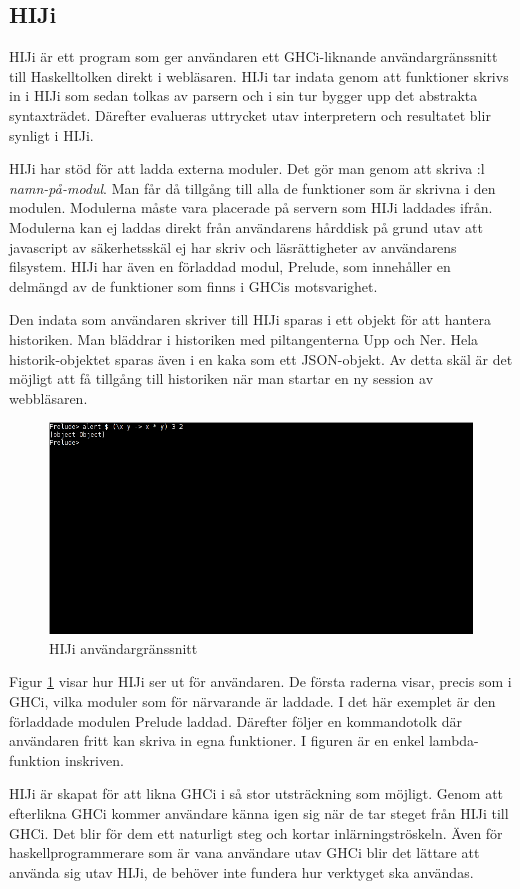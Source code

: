 \subsection{HIJi}

HIJi är ett program som ger användaren ett GHCi-liknande användargränssnitt till Haskelltolken direkt i webläsaren. 
HIJi tar indata genom att funktioner skrivs in i HIJi som sedan tolkas av parsern och i sin tur bygger upp det abstrakta syntaxträdet. Därefter evalueras uttrycket utav interpretern och resultatet blir synligt i HIJi.

HIJi har stöd för att ladda externa moduler. Det gör man genom att skriva :l \emph{namn-på-modul}. Man får då tillgång till alla de funktioner som är skrivna i den modulen. Modulerna måste vara placerade på servern som HIJi laddades ifrån. Modulerna kan ej laddas direkt från användarens hårddisk på grund utav att javascript av säkerhetsskäl ej har skriv och läsrättigheter av användarens filsystem. HIJi har även en förladdad modul, Prelude, som innehåller en delmängd av de funktioner som finns i GHCis motsvarighet. 

Den indata som användaren skriver till HIJi sparas i ett objekt för att hantera historiken. Man bläddrar i historiken med piltangenterna Upp och Ner. Hela historik-objektet sparas även i en kaka som ett JSON-objekt. Av detta skäl är det möjligt att få tillgång till historiken när man startar en ny session av webbläsaren.

\begin{figure}[H]
    \begin{center}
        \includegraphics[width=1\textwidth]{hiji_screen3.png}
        \caption{HIJi användargränssnitt}
        \label{fig:hiji} %
    \end{center}
\end{figure}

Figur \ref{fig:hiji} visar hur HIJi ser ut för användaren. De första raderna visar, precis som i GHCi, vilka moduler som för närvarande är laddade. I det här exemplet är den förladdade modulen Prelude laddad. Därefter följer en kommandotolk där användaren fritt kan skriva in egna funktioner. I figuren är en enkel lambda-funktion inskriven.

HIJi är skapat för att likna GHCi i så stor utsträckning som möjligt.
Genom att efterlikna GHCi kommer användare känna igen sig när de tar steget från HIJi till GHCi. Det blir för dem ett naturligt steg och kortar inlärningströskeln. Även för haskellprogrammerare som är vana användare utav GHCi blir det lättare att använda sig utav HIJi, de behöver inte fundera hur verktyget ska användas.
